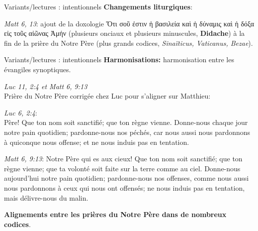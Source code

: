 \documentclass[11pt]{beamer}
\begin{document}
\begin{frame}{Variants/lectures : intentionnels}
    \textbf{Changements liturgiques}:\\
    \begin{block}{}
    \emph{Matt 6, 13}: ajout de la doxologie \textgreek{Ὅτι σοῦ ἐστιν ἡ βασιλεία καὶ ἡ δύναμις καὶ ἡ δόξα εἰς τοῦς αἰῶνας Ἀμήν} (plusieurs onciaux et plusieurs minuscules, \textbf{Didache}) à la fin de la prière du Notre Père (plus grands codices, \textit{Sinaïticus, Vaticanus, Bezae}).
    \end{block}
\end{frame}

\begin{frame}{Variants/lectures : intentionnels}
    \textbf{Harmonisations:} harmonisation entre les évangiles synoptiques.\\

    \begin{block}{}
       \emph{Luc 11, 2:4 et Matt 6, 9:13} \\
       Prière du Notre Père corrigée chez Luc pour s'aligner sur Matthieu:\\
       
        \footnotesize
       \begin{minipage}{.45\textwidth}
           \emph{Luc 6, 2:4}:\\
Père! Que ton nom soit sanctifié; que ton règne vienne. Donne-nous chaque jour notre pain quotidien; pardonne-nous nos péchés, car nous aussi nous pardonnons à quiconque nous offense; et ne nous induis pas en tentation.
       \end{minipage}
       \hfill
        \begin{minipage}{.45\textwidth}
    \emph{Matt 6, 9:13}:
Notre Père qui es aux cieux! Que ton nom soit sanctifié; que ton règne vienne; que ta volonté soit faite sur la terre comme au ciel. Donne-nous aujourd'hui notre pain quotidien; pardonne-nous nos offenses, comme nous aussi nous pardonnons à ceux qui nous ont offensés; ne nous induis pas en tentation, mais délivre-nous du malin.
       \end{minipage}

\textbf{Alignements entre les prières du Notre Père dans de nombreux codices}.
    \end{block}
\end{frame}
\end{document}
